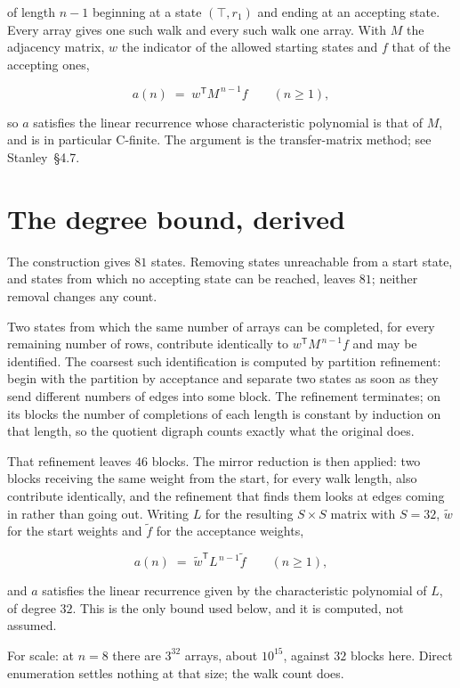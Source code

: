 \documentclass[11pt]{article}
\theoremstyle{definition}
\begin{document}
of length $n-1$ beginning at a state $(\top,r_1)$ and ending at an accepting state. Every array gives one such walk and every such walk one array. With $M$ the adjacency matrix, $w$ the indicator of the allowed starting states and $f$ that of the accepting ones,

\[a(n) \;=\; w^{\mathsf T} M^{\,n-1} f \qquad (n \ge 1),\]

so $a$ satisfies the linear recurrence whose characteristic polynomial is that of $M$, and is in particular C-finite. The argument is the transfer-matrix method; see Stanley~\S4.7.

\section{The degree bound, derived}

The construction gives $81$ states. Removing states unreachable from a start state, and states from which no accepting state can be reached, leaves $81$; neither removal changes any count.

Two states from which the same number of arrays can be completed, for every remaining number of rows, contribute identically to $w^{\mathsf T}M^{\,n-1}f$ and may be identified. The coarsest such identification is computed by partition refinement: begin with the partition by acceptance and separate two states as soon as they send different numbers of edges into some block. The refinement terminates; on its blocks the number of completions of each length is constant by induction on that length, so the quotient digraph counts exactly what the original does.

That refinement leaves $46$ blocks. The mirror reduction is then applied: two blocks receiving the same weight from the start, for every walk length, also contribute identically, and the refinement that finds them looks at edges coming in rather than going out. Writing $L$ for the resulting $S \times S$ matrix with $S = 32$, $\tilde w$ for the start weights and $\tilde f$ for the acceptance weights,

\[a(n) \;=\; \tilde w^{\mathsf T} L^{\,n-1} \tilde f \qquad (n \ge 1),\]

and $a$ satisfies the linear recurrence given by the characteristic polynomial of $L$, of degree $32$. This is the only bound used below, and it is computed, not assumed.

For scale: at $n = 8$ there are $3^{32}$ arrays, about $10^{15}$, against $32$ blocks here. Direct enumeration settles nothing at that size; the walk count does.
\end{document}
